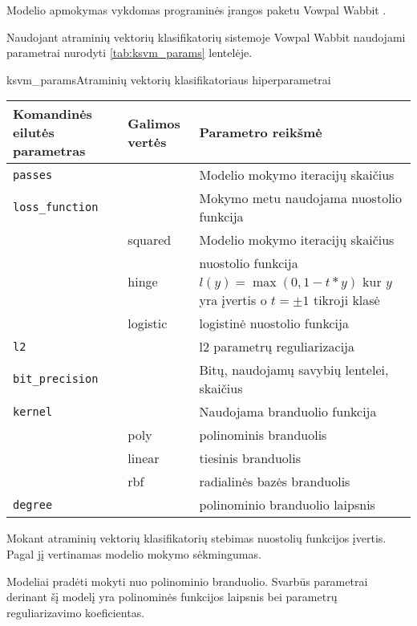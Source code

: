 
Modelio apmokymas vykdomas programinės įrangos paketu Vowpal Wabbit \cite{vw}.


Naudojant atraminių vektorių klasifikatorių sistemoje Vowpal Wabbit naudojami parametrai nurodyti \vref{tab:ksvm_params} lentelėje.

\begin{ktutable}{ksvm_params}{Atraminių vektorių klasifikatoriaus hiperparametrai}
    \begin{tabular}{| l | l | p{7cm}|}
    \hline
        Komandinės eilutės parametras & Galimos vertės & Parametro reikšmė\\ \hline
        \texttt{passes} &  & Modelio mokymo iteracijų skaičius \\ \hline
        \texttt{loss\_function} &          & Mokymo metu naudojama nuostolio funkcija \\
                               & squared  & Modelio mokymo iteracijų skaičius \\
                               & hinge    & nuostolio funkcija $l(y) = \max(0, 1 - t * y)$ kur $y$ yra įvertis o $t = \pm 1$ tikroji klasė  \\
                               & logistic & logistinė nuostolio funkcija \\ \hline
        \texttt{l2} & & l2 parametrų reguliarizacija \\ \hline
        \texttt{bit\_precision} & & Bitų, naudojamų savybių lentelei, skaičius\\ \hline
        \texttt{kernel} & & Naudojama branduolio funkcija   \\
                       & poly & polinominis branduolis     \\
                       & linear & tiesinis branduolis      \\
                       & rbf & radialinės bazės branduolis \\ \hline
        \texttt{degree} & & polinominio branduolio laipsnis \\ \hline
    \end{tabular}
\end{ktutable}

Mokant atraminių vektorių klasifikatorių stebimas nuostolių funkcijos įvertis. Pagal jį
vertinamas modelio mokymo sėkmingumas.

Modeliai pradėti mokyti nuo polinominio branduolio. Svarbūs parametrai derinant šį modelį yra polinominės
funkcijos laipsnis bei parametrų reguliarizavimo koeficientas.

